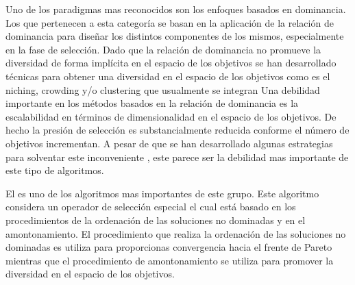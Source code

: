 Uno de los paradigmas mas reconocidos son los enfoques basados en dominancia.
%
Los \MOEAS{} que pertenecen a esta categoría se basan en la aplicación de la relación de dominancia para diseñar los distintos componentes de los mismos, especialmente en la fase de selección.
%
Dado que la relación de dominancia no promueve la diversidad de forma implícita en el espacio de los objetivos se han desarrollado técnicas para obtener una diversidad en el espacio de los objetivos como es el niching, crowding y/o clustering que usualmente se integran
%
Una debilidad importante en los métodos basados en la relación de dominancia es la escalabilidad en términos de dimensionalidad en el espacio de los objetivos.
%
De hecho la presión de selección es substancialmente reducida conforme el número de objetivos incrementan.
%
A pesar de que se han desarrollado algunas estrategias para solventar este inconveniente \cite{horoba2008benefits}, este parece ser la debilidad mas importante de este tipo de algoritmos.

El \NSGAII{} es uno de los algoritmos mas importantes de este grupo.
%
Este algoritmo~\cite{Joel:NSGAII} considera un operador de selección especial el cual está basado en los procedimientos de la ordenación de las soluciones no dominadas y en el amontonamiento.
%
El procedimiento que realiza la ordenación de las soluciones no dominadas es utiliza para proporcionas convergencia hacia el frente de Pareto mientras que el procedimiento de amontonamiento se utiliza para promover la diversidad en el espacio de los objetivos.
%
%

